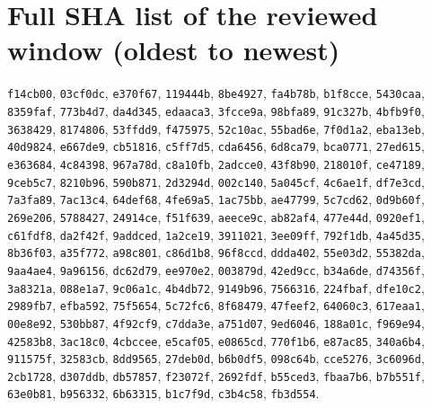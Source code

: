 \documentclass[11pt]{article}
\theoremstyle{definition}
\theoremstyle{remark}
\begin{document}
\section{Full SHA list of the reviewed window (oldest to newest)}\label{app:shas}
{\footnotesize\raggedright
\texttt{f14cb00}, \texttt{03cf0dc}, \texttt{e370f67}, \texttt{119444b}, \texttt{8be4927}, \texttt{fa4b78b}, \texttt{b1f8cce}, \texttt{5430caa}, \texttt{8359faf}, \texttt{773b4d7}, \texttt{da4d345}, \texttt{edaaca3}, \texttt{3fcce9a}, \texttt{98bfa89}, \texttt{91c327b}, \texttt{4bfb9f0}, \texttt{3638429}, \texttt{8174806}, \texttt{53ffdd9}, \texttt{f475975}, \texttt{52c10ac}, \texttt{55bad6e}, \texttt{7f0d1a2}, \texttt{eba13eb}, \texttt{40d9824}, \texttt{e667de9}, \texttt{cb51816}, \texttt{c5ff7d5}, \texttt{cda6456}, \texttt{6d8ca79}, \texttt{bca0771}, \texttt{27ed615}, \texttt{e363684}, \texttt{4c84398}, \texttt{967a78d}, \texttt{c8a10fb}, \texttt{2adcce0}, \texttt{43f8b90}, \texttt{218010f}, \texttt{ce47189}, \texttt{9ceb5c7}, \texttt{8210b96}, \texttt{590b871}, \texttt{2d3294d}, \texttt{002c140}, \texttt{5a045cf}, \texttt{4c6ae1f}, \texttt{df7e3cd}, \texttt{7a3fa89}, \texttt{7ac13c4}, \texttt{64def68}, \texttt{4fe69a5}, \texttt{1ac75bb}, \texttt{ae47799}, \texttt{5c7cd62}, \texttt{0d9b60f}, \texttt{269e206}, \texttt{5788427}, \texttt{24914ce}, \texttt{f51f639}, \texttt{aeece9c}, \texttt{ab82af4}, \texttt{477e44d}, \texttt{0920ef1}, \texttt{c61fdf8}, \texttt{da2f42f}, \texttt{9addced}, \texttt{1a2ce19}, \texttt{3911021}, \texttt{3ee09ff}, \texttt{792f1db}, \texttt{4a45d35}, \texttt{8b36f03}, \texttt{a35f772}, \texttt{a98c801}, \texttt{c86d1b8}, \texttt{96f8ccd}, \texttt{ddda402}, \texttt{55e03d2}, \texttt{55382da}, \texttt{9aa4ae4}, \texttt{9a96156}, \texttt{dc62d79}, \texttt{ee970e2}, \texttt{003879d}, \texttt{42ed9cc}, \texttt{b34a6de}, \texttt{d74356f}, \texttt{3a8321a}, \texttt{088e1a7}, \texttt{9c06a1c}, \texttt{4b4db72}, \texttt{9149b96}, \texttt{7566316}, \texttt{224fbaf}, \texttt{dfe10c2}, \texttt{2989fb7}, \texttt{efba592}, \texttt{75f5654}, \texttt{5c72fc6}, \texttt{8f68479}, \texttt{47feef2}, \texttt{64060c3}, \texttt{617eaa1}, \texttt{00e8e92}, \texttt{530bb87}, \texttt{4f92cf9}, \texttt{c7dda3e}, \texttt{a751d07}, \texttt{9ed6046}, \texttt{188a01c}, \texttt{f969e94}, \texttt{42583b8}, \texttt{3ac18c0}, \texttt{4cbccee}, \texttt{e5caf05}, \texttt{e0865cd}, \texttt{770f1b6}, \texttt{e87ac85}, \texttt{340a6b4}, \texttt{911575f}, \texttt{32583cb}, \texttt{8dd9565}, \texttt{27deb0d}, \texttt{b6b0df5}, \texttt{098c64b}, \texttt{cce5276}, \texttt{3c6096d}, \texttt{2cb1728}, \texttt{d307ddb}, \texttt{db57857}, \texttt{f23072f}, \texttt{2692fdf}, \texttt{b55ced3}, \texttt{fbaa7b6}, \texttt{b7b551f}, \texttt{63e0b81}, \texttt{b956332}, \texttt{6b63315}, \texttt{b1c7f9d}, \texttt{c3b4c58}, \texttt{fb3d554}.
\par}
\end{document}
